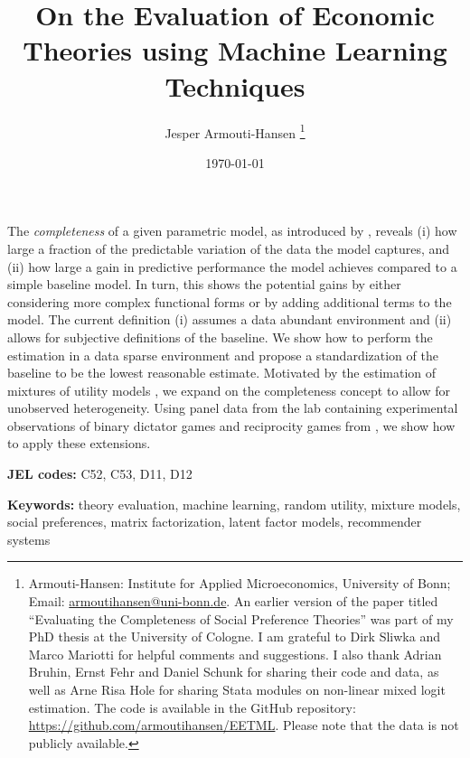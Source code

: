 \documentclass[letterpaper,11pt,leqno]{article}
\begin{document}
\title{On the Evaluation of Economic Theories using Machine Learning Techniques}

\author{Jesper Armouti-Hansen
%
\thanks{Armouti-Hansen: Institute for Applied Microeconomics, University of Bonn; Email: \href{mailto:armoutihansen@uni-bonn.de}{armoutihansen@uni-bonn.de}. An earlier version of the paper titled ``Evaluating the Completeness of Social Preference Theories'' was part of my PhD thesis at the University of Cologne. I am grateful to Dirk Sliwka and Marco Mariotti for helpful comments and suggestions. I also thank Adrian Bruhin, Ernst Fehr and Daniel Schunk for sharing their code and data, as well as Arne Risa Hole for sharing Stata modules on non-linear mixed logit estimation. The code is available in the GitHub repository: \href{https://github.com/armoutihansen/EETML}{https://github.com/armoutihansen/EETML}. Please note that the data is not publicly available.}}

\date{\today}   


\begin{titlepage}
\maketitle

The \emph{completeness} of a given parametric model, as introduced by \citet{Fudenberg2022}, reveals (i) how large a fraction of the predictable variation of the data the model captures, and (ii) how large a gain in predictive performance the model achieves compared to a simple baseline model. In turn, this shows the potential gains by either considering more complex functional forms or by adding additional terms to the model. The current definition (i) assumes a data abundant environment and (ii) allows for subjective definitions of the baseline. We show how to perform the estimation in a data sparse environment and propose a standardization of the baseline to be the lowest reasonable estimate. Motivated by the estimation of mixtures of utility models \citep[See e.g.,][]{Bruhin2010}, we expand on the completeness concept to allow for unobserved heterogeneity. Using panel data from the lab containing experimental observations of binary dictator games and reciprocity games from \citet{Bruhin2019}, we show how to apply these extensions.

\textbf{JEL codes:} C52, C53, D11, D12

\textbf{Keywords:} theory evaluation, machine learning, random utility, mixture models, social preferences, matrix factorization, latent factor models, recommender systems

\end{titlepage}
\end{document}
